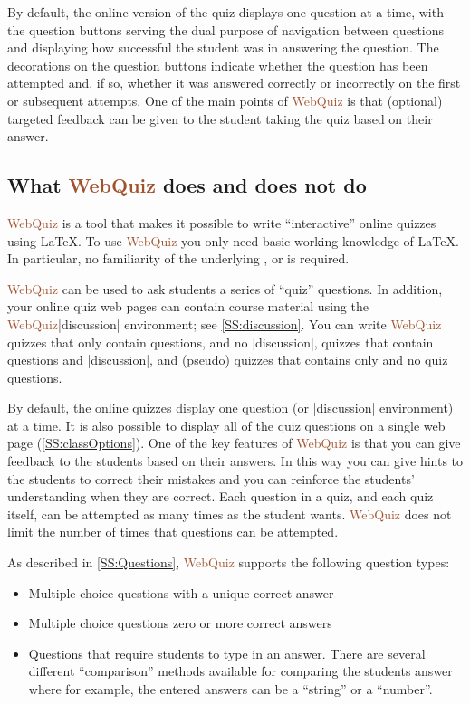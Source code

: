\documentclass[svgnames]{article}
\newcommand\WebQuiz{\textcolor{Sienna}{WebQuiz}\xspace}
\begin{document}
      By default, the online version of the quiz displays one question at
      a time, with the question buttons serving the dual purpose of
      navigation between questions and displaying how successful the
      student was in answering the question. The decorations on the
      question buttons indicate whether the question has been attempted
      and, if so, whether it was answered correctly or incorrectly on the
      first or subsequent attempts. One of the main points of \WebQuiz is
      that (optional) targeted feedback can be given to the student taking
      the quiz based on their answer.

  \subsection{What \WebQuiz does and does not do}

      \WebQuiz is a tool that makes it possible to write ``interactive''
      online quizzes using \LaTeX{}. To use \WebQuiz you only need
      basic working knowledge of \LaTeX{}. In particular, no familiarity
      of the underlying \CSS, \HTML or \Javascript is required.

      \WebQuiz can be used to ask students a series of ``quiz''
      questions. In addition, your online quiz web pages can contain
      course material using the \WebQuiz \LatexCode|discussion|
      environment; see \autoref{SS:discussion}. You can write \WebQuiz
      quizzes that only contain questions, and no
      \LatexCode|discussion|, quizzes that contain questions and
      \LatexCode|discussion|, and (pseudo) quizzes that contains only
       and no quiz questions.

      By default, the online quizzes display one question (or
      \LatexCode|discussion| environment) at a time.  It is also possible
      to display all of the quiz questions on a single web page
      (\autoref{SS:classOptions}). One of the key features of \WebQuiz is
      that you can give feedback to the students based on their answers.
      In this way you can give hints to the students to correct their
      mistakes and you can reinforce the students' understanding when they
      are correct. Each question in a quiz, and each quiz itself, can be
      attempted as many times as the student wants. \WebQuiz does not
      limit the number of times that questions can be attempted.

      As described in \autoref{SS:Questions}, \WebQuiz  supports the following question types:
      \begin{itemize}
        \item Multiple choice questions with a unique correct answer
        \item Multiple choice questions zero or more correct answers
        \item Questions that require students to type in an answer. There
        are several different ``comparison'' methods available for
        comparing the students answer where
        for example, the entered answers can be a ``string'' or a ``number''.
      \end{itemize}
\end{document}
